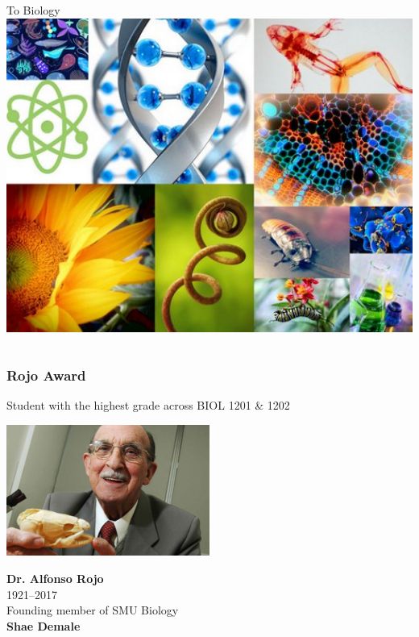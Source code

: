 \documentclass[10pt]{beamer}
\begin{document}
\begin{frame}[t]
\begin{columns}[T]
		\begin{column}{0.5\textwidth}
			\begin{center}
				To Biology\\
				\vspace{0.25cm}
				\includegraphics[width=1.0\textwidth]{figures/biology.jpg}
			\end{center}
		\end{column}
	\end{columns}	
\end{frame}


\begin{frame}[t]
\frametitle{Rojo Award}

	\begin{center}
		Student with the highest grade across BIOL 1201 \& 1202
		
		\vspace{0.5cm}
		
		\includegraphics[width=0.5\textwidth]{figures/Rojo.jpg}
		
		\textbf{Dr. Alfonso Rojo}\\
		1921--2017\\
		Founding member of SMU Biology\\
		
		\vspace{0.25cm} \textbf{\textcolor{myblue}{Shae Demale}}
	\end{center}

\end{frame}
\end{document}
